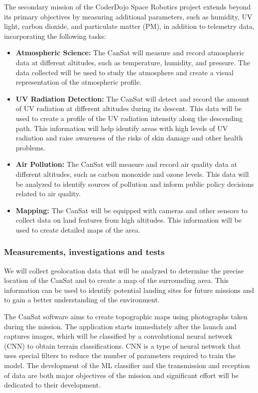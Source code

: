 \documentclass[11pt]{article}
\begin{document}
The secondary mission of the CoderDojo Space Robotics project extends beyond its primary objectives by measuring additional parameters, such as humidity, UV light, carbon dioxide, and particulate matter (PM), in addition to telemetry data, incorporating the following tasks:
\begin{itemize}[leftmargin=1.27cm, itemindent=0cm, topsep=2pt, label=\faTasks]
    \item {\textbf{Atmospheric Science:}} The CanSat will measure and record atmospheric data at different altitudes, such as temperature, humidity, and pressure. The data collected will be used to study the atmosphere and create a visual representation of the atmospheric profile.
    \item {\textbf{UV Radiation Detection:}} The CanSat will detect and record the amount of UV radiation at different altitudes during its descent. This data will be used to create a profile of the UV radiation intensity along the descending path. This information will help identify areas with high levels of UV radiation and raise awareness of the risks of skin damage and other health problems.
    \item {\textbf{Air Pollution:}} The CanSat will measure and record air quality data at different altitudes, such as carbon monoxide and ozone levels. This data will be analyzed to identify sources of pollution and inform public policy decisions related to air quality.
    \item {\textbf{Mapping:}} The CanSat will be equipped with cameras and other sensors to collect data on land features from high altitudes. This information will be used to create detailed maps of the area.
\end{itemize}
\subsubsection{Measurements, investigations and tests}

We will collect geolocation data that will be analyzed to determine the precise location of the CanSat and to create a map of the surrounding area. This information can be used to identify potential landing sites for future missions and to gain a better understanding of the environment. 

The CanSat software aims to create topographic maps using photographs taken during the mission. The application starts immediately after the launch and captures images, which will be classified by a convolutional neural network (CNN) to obtain terrain classifications. CNN is a type of neural network that uses special filters to reduce the number of parameters required to train the model. The development of the ML classifier and the transmission and reception of data are both major objectives of the mission and significant effort will be dedicated to their development.
\end{document}
